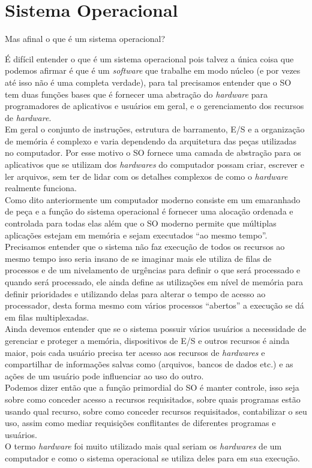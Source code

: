 \chapter[Sistema Operaciona]{Sistema Operacional}

Mas afinal o que é um sistema operacional?

É difícil entender o que é um sistema operacional pois talvez a única coisa que podemos afirmar é que é um \emph{software} que trabalhe em modo núcleo (e por vezes até isso não é uma completa verdade), para tal precisamos entender que o SO tem duas funções bases que é fornecer uma abstração do \emph{hardware} para programadores de aplicativos e usuários em geral, e o gerenciamento dos recursos de \emph{hardware}.\\
 Em geral o conjunto de instruções, estrutura de barramento, E/S e a organização de memória é complexo e varia dependendo da arquitetura das peças utilizadas no computador. Por esse motivo o SO fornece uma camada de abstração para os aplicativos que se utilizam dos \emph{hardwares} do computador possam criar, escrever e ler arquivos, sem ter de lidar com os detalhes complexos de como o \emph{hardware} realmente funciona.\\
Como dito anteriormente um computador moderno consiste em um emaranhado de peça e a função do sistema operacional é fornecer uma alocação ordenada e controlada para todas elas além que o SO moderno permite que múltiplas aplicações estejam em memória e sejam executados “ao mesmo tempo”. \\
Precisamos entender que o sistema não faz  execução de todos os recursos ao mesmo tempo isso seria insano de se imaginar mais ele utiliza de filas de processos e de um nivelamento de urgências para definir o que será processado e quando será processado, ele ainda define as utilizações em nível de memória para definir prioridades e utilizando delas para alterar o tempo  de acesso ao processador, desta forma mesmo com vários processos “abertos” a execução se dá em filas multiplexadas.\\
Ainda devemos entender que se o sistema possuir vários usuários a necessidade de gerenciar e proteger a memória, dispositivos de E/S e outros recursos é ainda maior, pois cada usuário precisa ter acesso aos recursos de \emph{hardwares} e compartilhar de informações salvas como (arquivos, bancos de dados etc.) e as ações de um usuário pode influenciar ao uso do outro. \\
Podemos dizer então que a função primordial do SO é manter controle, isso seja sobre como conceder acesso a recursos requisitados, sobre quais programas estão usando qual recurso, sobre como conceder recursos requisitados, contabilizar o seu uso, assim como mediar requisições conflitantes de diferentes programas e usuários.\\
O termo \emph{hardware} foi muito utilizado mais qual seriam os \emph{hardwares} de um computador e como o sistema operacional se utiliza deles para em sua execução. 

